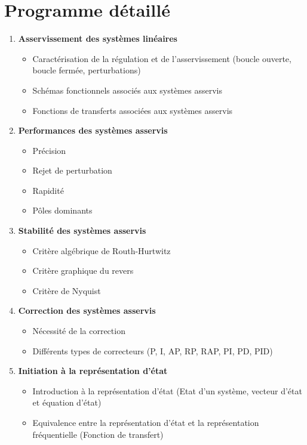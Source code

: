 \documentclass[a4paper,11pt]{article}
\begin{document}
\section*{Programme détaillé}
\begin{enumerate}
    \item \textbf{Asservissement des systèmes linéaires}
        \begin{itemize}
            \item Caractérisation de la régulation et de l'asservissement 
                  (boucle ouverte, boucle fermée, perturbations)
            \item Schémas fonctionnels associés aux systèmes asservis
            \item Fonctions de transferts associées aux systèmes asservis
        \end{itemize}
    \item \textbf{Performances des systèmes asservis}
        \begin{itemize}
            \item Précision
            \item Rejet de perturbation
            \item Rapidité
            \item Pôles dominants
        \end{itemize}
    \item \textbf{Stabilité des systèmes asservis}
        \begin{itemize} 
            \item Critère algébrique de Routh-Hurtwitz
            \item Critère graphique du revers
            \item Critère de Nyquist
        \end{itemize}
    \item \textbf{Correction des systèmes asservis}
        \begin{itemize}
            \item Nécessité de la correction
            \item Différents types de correcteurs (P, I, AP, RP, RAP, PI, PD, PID)
        \end{itemize}
    \item \textbf{Initiation à la représentation d'état}
        \begin{itemize}
            \item Introduction à la représentation d'état 
                  (Etat d'un système, vecteur d'état et équation d'état)
            \item Equivalence entre la représentation d'état et la représentation fréquentielle (Fonction de transfert) 
        \end{itemize}
\end{enumerate}
\end{document}
